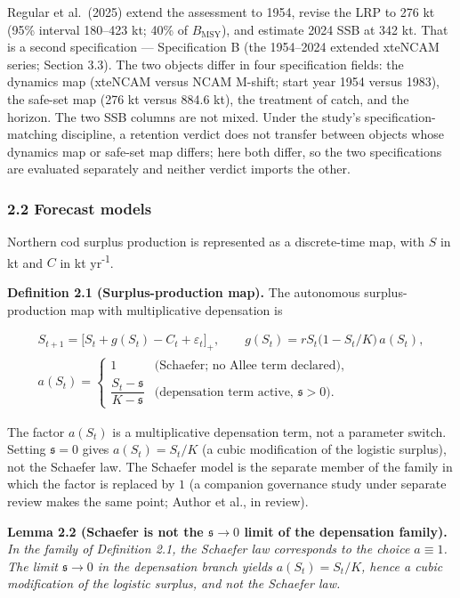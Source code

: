 \documentclass[11pt]{article}
\begin{document}
Regular et al.~(2025) extend the assessment to 1954, revise the LRP to
276 kt (95\% interval 180--423 kt; 40\% of \(B_{\mathrm{MSY}}\)), and
estimate 2024 SSB at 342 kt. That is a second specification ---
Specification B (the 1954--2024 extended xteNCAM series; Section 3.3).
The two objects differ in four specification fields: the dynamics map
(xteNCAM versus NCAM M-shift; start year 1954 versus 1983), the safe-set
map (276 kt versus 884.6 kt), the treatment of catch, and the horizon.
The two SSB columns are not mixed. Under the study's
specification-matching discipline, a retention verdict does not transfer
between objects whose dynamics map or safe-set map differs; here both
differ, so the two specifications are evaluated separately and neither
verdict imports the other.

\subsubsection{2.2 Forecast models}\label{forecast-models}

Northern cod surplus production is represented as a discrete-time map,
with \(S\) in kt and \(C\) in kt yr\textsuperscript{-1}.

\textbf{Definition 2.1 (Surplus-production map).} The autonomous
surplus-production map with multiplicative depensation is

\[
\begin{gathered}
S_{t+1}=\bigl[S_t+g(S_t)-C_t+\varepsilon_t\bigr]_+,
\qquad
g(S_t)=rS_t\bigl(1-S_t/K\bigr)\,a(S_t),
\\
a(S_t)=
\begin{cases}
1 & \text{(Schaefer; no Allee term declared)},\\[2pt]
\dfrac{S_t-\mathfrak s}{K-\mathfrak s} & \text{(depensation term active, $\mathfrak s>0$)}.
\end{cases}
\end{gathered}
\]

The factor \(a(S_t)\) is a multiplicative depensation term, not a
parameter switch. Setting \(\mathfrak s=0\) gives \(a(S_t)=S_t/K\) (a
cubic modification of the logistic surplus), not the Schaefer law. The
Schaefer model is the separate member of the family in which the factor
is replaced by \(1\) (a companion governance study under separate review
makes the same point; Author et al., in review).

\textbf{Lemma 2.2 (Schaefer is not the \(\mathfrak s\to 0\) limit of the
depensation family).} \emph{In the family of Definition 2.1, the
Schaefer law corresponds to the choice \(a\equiv 1\). The limit
\(\mathfrak s\to 0\) in the depensation branch yields \(a(S_t)=S_t/K\),
hence a cubic modification of the logistic surplus, and not the Schaefer
law.}
\end{document}
